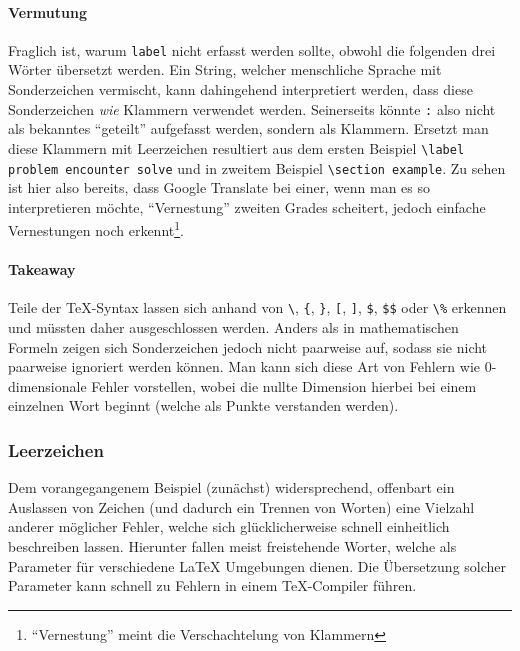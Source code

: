 \paragraph*{Vermutung}
Fraglich ist, warum \texttt{label} nicht erfasst werden sollte, obwohl die folgenden drei Wörter übersetzt werden. Ein String, welcher menschliche Sprache mit Sonderzeichen vermischt, kann dahingehend interpretiert werden, dass diese Sonderzeichen \textit{wie} Klammern verwendet werden. Seinerseits könnte \verb|:| also nicht als bekanntes \enquote{geteilt} aufgefasst werden, sondern als Klammern. Ersetzt man diese Klammern mit Leerzeichen resultiert aus dem ersten Beispiel \verb|\label problem encounter solve| und in zweitem Beispiel \verb|\section example|. Zu sehen ist hier also bereits, dass Google Translate bei einer, wenn man es so interpretieren möchte, \enquote{Vernestung} zweiten Grades scheitert, jedoch einfache Vernestungen noch erkennt\footnote{\enquote{Vernestung} meint die Verschachtelung von Klammern}.

\paragraph*{Takeaway}
Teile der \TeX{}-Syntax lassen sich anhand von \verb|\|, \verb|{|, \verb|}|, \verb|[|, \verb|]|, \verb|$|, \verb|$$| oder \verb|\%| erkennen und müssten daher ausgeschlossen werden. Anders als in mathematischen Formeln zeigen sich Sonderzeichen jedoch nicht paarweise auf, sodass sie nicht paarweise ignoriert werden können. Man kann sich diese Art von Fehlern wie 0-dimensionale Fehler vorstellen, wobei die nullte Dimension hierbei bei einem einzelnen Wort beginnt (welche als Punkte verstanden werden).%



\subsubsection{Leerzeichen}\label{problems:dim1}%
Dem vorangegangenem Beispiel (zunächst) widersprechend, offenbart ein Auslassen von Zeichen (und dadurch ein Trennen von Worten) eine Vielzahl anderer möglicher Fehler, welche sich glücklicherweise schnell einheitlich beschreiben lassen.%
Hierunter fallen meist freistehende Worter, welche als Parameter für verschiedene \LaTeX{} Umgebungen dienen. Die Übersetzung solcher Parameter kann schnell zu Fehlern in einem \TeX{}-Compiler führen.

